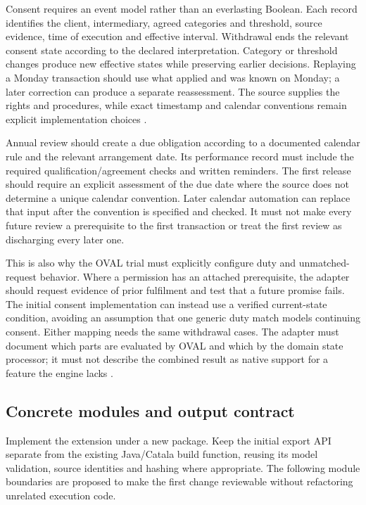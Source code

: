 Consent requires an event model rather than an everlasting Boolean. Each
record identifies the client, intermediary, agreed categories and threshold,
source evidence, time of execution and effective interval. Withdrawal ends the
relevant consent state according to the declared interpretation. Category or
threshold changes produce new effective states while preserving earlier
decisions. Replaying a Monday transaction should use what applied and was
known on Monday; a later correction can produce a separate reassessment.
The source supplies the rights and procedures, while exact timestamp and
calendar conventions remain explicit implementation choices
\citep[paras.~13.1--14.2]{sfcspiannex1}.

Annual review should create a due obligation according to a documented
calendar rule and the relevant arrangement date. Its performance record must
include the required qualification/agreement checks and written reminders.
The first release should require an explicit assessment of the due date
where the source does not determine a unique calendar convention. Later
calendar automation can replace that input after the convention is specified
and checked. It must not make every future review a prerequisite to the first
transaction or treat the first review as discharging every later one.

This is also why the OVAL trial must explicitly configure duty and
unmatched-request behavior. Where a permission has an attached prerequisite,
the adapter should request evidence of prior fulfilment and test that a future
promise fails. The initial consent implementation can instead use a verified
current-state condition, avoiding an assumption that one generic duty match
models continuing consent. Either mapping needs the same withdrawal cases.
The adapter must document which parts are evaluated by OVAL and which by the
domain state processor; it must not describe the combined result as native
support for a feature the engine lacks \citep{hkmaodrlsoftware2026}.

\subsection{Concrete modules and output contract}

Implement the extension under a new  package.
Keep the initial export API separate from the existing Java/Catala build
function, reusing its model validation, source identities and hashing where
appropriate. The following module boundaries are proposed to make the first
change reviewable without refactoring unrelated execution code.


